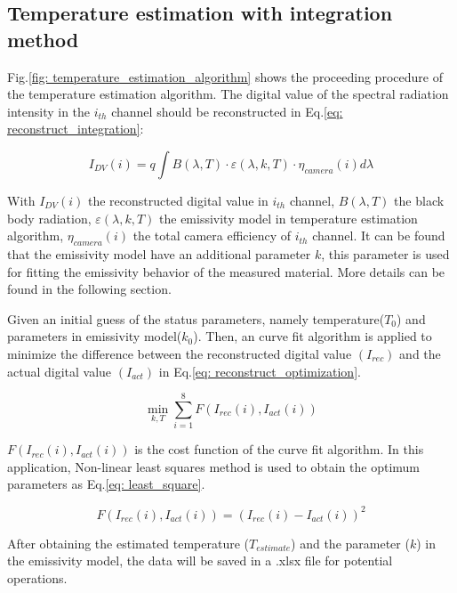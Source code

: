 \subsection{Temperature estimation with integration method}
Fig.\ref{fig: temperature_estimation_algorithm} shows the proceeding procedure of the 
temperature estimation algorithm. The digital value of the spectral radiation intensity 
in the $i_{th}$ channel should be reconstructed in Eq.\ref{eq: reconstruct_integration}:

\begin{equation}
    \label{eq: reconstruct_integration}
    I_{DV}(i) = q \int B(\lambda, T) \cdot \varepsilon(\lambda, k, T) \cdot \eta_{camera}(i) d\lambda
\end{equation}

With $I_{DV}(i)$ the reconstructed digital value in $i_{th}$ channel, $B(\lambda, T)$ the black body radiation, 
$\varepsilon(\lambda, k, T)$ the emissivity model in temperature estimation algorithm, 
$\eta_{camera}(i)$ the total camera efficiency of $i_{th}$ channel. It can be found that 
the emissivity model have an additional parameter $k$, this parameter is used for fitting 
the emissivity behavior of the measured material. More details can be found in the following 
section.


Given an initial guess of the status parameters, namely 
temperature($T_0$) and parameters in emissivity model($k_0$). Then, an curve fit 
algorithm is applied to minimize the difference between the reconstructed digital value $(I_{rec})$ 
and the actual digital value $(I_{act})$ in Eq.\ref{eq: reconstruct_optimization}.

\begin{equation}
    \label{eq: reconstruct_optimization}
    \min_{k, T}\sum_{i=1}^{8}  F(I_{rec}(i), I_{act}(i))
\end{equation} 

$F(I_{rec}(i), I_{act}(i))$ is the cost function of the curve fit algorithm. In this 
application, Non-linear least squares method is used to obtain the optimum parameters 
as Eq.\ref{eq: least_square}.

\begin{equation}
    \label{eq: least_square}
    F(I_{rec}(i), I_{act}(i)) = (I_{rec}(i) - I_{act}(i))^2
\end{equation}


After obtaining the estimated temperature ($T_{estimate}$) and the parameter ($k$) 
in the emissivity model, the data will be saved in a .xlsx file for 
potential operations.

